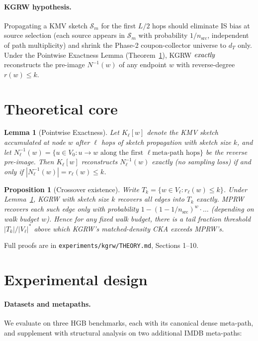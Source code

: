 \documentclass[11pt]{article}
\newtheorem{lemma}{Lemma}
\newtheorem{proposition}{Proposition}
\begin{document}
\paragraph{KGRW hypothesis.}
Propagating a KMV sketch $\mathcal{S}_m$ for the first $L/2$ hops should
eliminate IS bias at source selection (each source appears in $\mathcal{S}_m$
with probability $1/n_\text{src}$, independent of path multiplicity) and
shrink the Phase-2 coupon-collector universe to $d_T$ only. Under the
Pointwise Exactness Lemma (Theorem~\ref{thm:ptwise}), KGRW $\it exactly$
reconstructs the pre-image $N^{-1}(w)$ of any endpoint $w$ with
reverse-degree $r(w) \le k$.

\section{Theoretical core}

\begin{lemma}[Pointwise Exactness]
\label{thm:ptwise}
Let $K_\ell[w]$ denote the KMV sketch accumulated at node $w$ after
$\ell$ hops of sketch propagation with sketch size $k$, and let
$N_\ell^{-1}(w) = \{u \in V_0 : u \to w \text{ along the first } \ell \text{
meta-path hops}\}$ be the reverse pre-image. Then $K_\ell[w]$ reconstructs
$N_\ell^{-1}(w)$ exactly (no sampling loss) if and only if
$|N_\ell^{-1}(w)| = r_\ell(w) \le k$.
\end{lemma}

\begin{proposition}[Crossover existence]
\label{prop:crossover}
Write $T_k = \{w \in V_\ell : r_\ell(w) \le k\}$. Under Lemma~\ref{thm:ptwise},
KGRW with sketch size $k$ recovers all edges into $T_k$ exactly. MPRW
recovers each such edge only with probability $1 - (1 - 1/n_\text{src})^w
\cdot \ldots$ (depending on walk budget $w$). Hence for any fixed walk
budget, there is a tail fraction threshold
$|T_k|/|V_\ell|^*$ above which KGRW's matched-density CKA exceeds MPRW's.
\end{proposition}

Full proofs are in \texttt{experiments/kgrw/THEORY.md}, Sections 1--10.

\section{Experimental design}

\paragraph{Datasets and metapaths.}
We evaluate on three HGB benchmarks, each with its canonical dense meta-path,
and supplement with structural analysis on two additional IMDB meta-paths:
\end{document}
